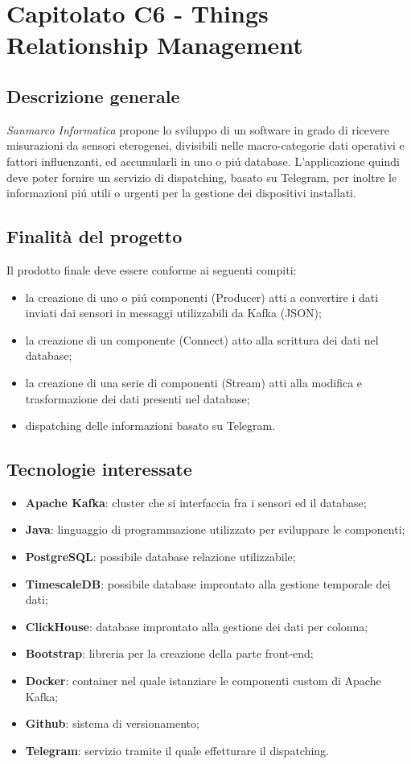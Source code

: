 \section{Capitolato C6 - Things Relationship Management}

\subsection{Descrizione generale}
\textit{Sanmarco Informatica} propone lo sviluppo di un software in grado di ricevere misurazioni da sensori eterogenei, divisibili nelle macro-categorie {dati operativi} e {fattori influenzanti}, ed accumularli in uno o piú database. L'applicazione quindi deve poter fornire un servizio di dispatching, basato su Telegram, per inoltre le informazioni piú utili o urgenti per la gestione dei dispositivi installati.

\subsection{Finalità del progetto}
Il prodotto finale deve essere conforme ai seguenti compiti:
\begin{itemize}
	\item la creazione di uno o piú componenti (Producer) atti a convertire i dati inviati dai sensori in messaggi utilizzabili da Kafka (JSON);
	\item la creazione di un componente (Connect) atto alla scrittura dei dati nel database;
	\item la creazione di una serie di componenti (Stream) atti alla modifica e trasformazione dei dati presenti nel database;
	\item dispatching delle informazioni basato su Telegram.
\end{itemize}

\subsection{Tecnologie interessate}
\begin{itemize}
	\item \textbf{Apache Kafka}: cluster che si interfaccia fra i sensori ed il database;
	\item \textbf{Java}: linguaggio di programmazione utilizzato per sviluppare le componenti;
	\item \textbf{PostgreSQL}: possibile database relazione utilizzabile;
	\item \textbf{TimescaleDB}: possibile database improntato alla gestione temporale dei dati;
	\item \textbf{ClickHouse}: database improntato alla gestione dei dati per colonna;
	\item \textbf{Bootstrap}: libreria per la creazione della parte front-end;
	\item \textbf{Docker}: container nel quale istanziare le componenti custom di Apache Kafka;
	\item \textbf{Github}: sistema di versionamento;
	\item \textbf{Telegram}: servizio tramite il quale effetturare il dispatching.
\end{itemize}

